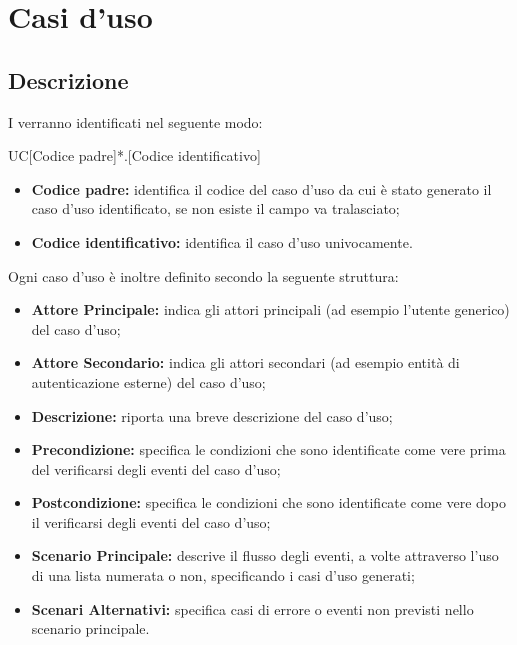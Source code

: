 \documentclass[../AnalisideiRequisiti.tex]{subfiles}
\begin{document}

	\chapter{Casi d'uso}
	\section{Descrizione}
	I  verranno identificati nel seguente modo: 
	
	\begin{center}
		UC[Codice padre]*.[Codice identificativo]
	\end{center}
	
	\begin{itemize}
		\item \textbf{Codice padre:} identifica il codice del caso d'uso da cui è stato generato il caso d'uso identificato, se non esiste il campo va tralasciato;
		\item \textbf{Codice identificativo:} identifica il caso d'uso univocamente.
	\end{itemize}
	
	\noindent Ogni caso d'uso è inoltre definito secondo la seguente struttura:
	\begin{itemize}
		\item \textbf{Attore Principale:} indica gli attori principali (ad esempio l'utente generico) del caso d'uso;
		\item \textbf{Attore Secondario:} indica gli attori secondari (ad esempio entità di autenticazione esterne) del caso d'uso;
		\item \textbf{Descrizione:} riporta una breve descrizione del caso d'uso;
		\item \textbf{Precondizione:} specifica le condizioni che sono identificate come vere prima del verificarsi degli eventi del caso d'uso;
		\item \textbf{Postcondizione:} specifica 	le condizioni che sono identificate come vere dopo il verificarsi degli eventi del caso d'uso;
		\item \textbf{Scenario Principale:} descrive il flusso degli eventi, a volte attraverso l'uso di una lista numerata o non, specificando i casi d'uso generati;
		\item \textbf{Scenari Alternativi:} specifica casi di errore o eventi non previsti nello scenario principale.
		
	\end{itemize}
\end{document}
